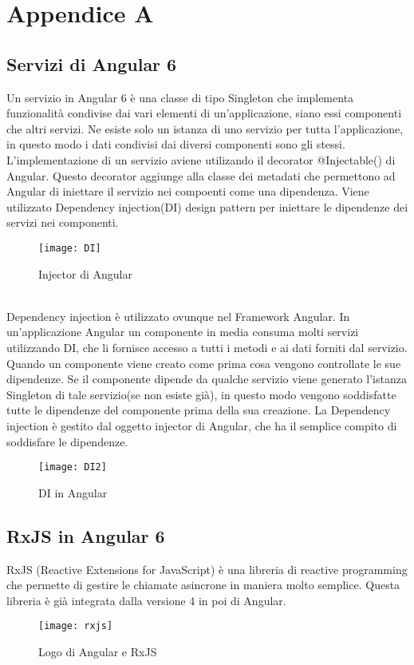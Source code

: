 
\chapter{Appendice A}
\section{Servizi di Angular 6}
 Un servizio in Angular 6 è una classe di tipo Singleton che implementa funzionalità condivise dai vari elementi di un’applicazione, siano essi componenti che altri servizi.
Ne esiste solo un istanza di uno servizio per tutta l'applicazione, in questo modo i dati condivisi dai diversi componenti sono gli stessi.
\\

L'implementazione di un servizio aviene utilizando il decorator @Injectable() di Angular. Questo decorator aggiunge alla classe dei metadati che permettono ad Angular di iniettare il servizio nei compoenti come una dipendenza. Viene utilizzato Dependency injection(DI) design pattern per iniettare le dipendenze dei servizi nei componenti. 
\begin{figure}[!h] 
	\centering 
	\texttt{[image: DI]} 
	\caption{Injector di Angular}
\end{figure}
\\

Dependency injection è utilizzato ovunque nel Framework Angular. In un'applicazione Angular un componente in media consuma molti servizi utilizzando DI, che li fornisce accesso a tutti i metodi e ai dati forniti dal servizio. 
\\ 

Quando un componente viene creato come prima cosa vengono controllate le sue dipendenze. Se il componente dipende da qualche servizio viene generato l'istanza Singleton di tale servizio(se non esiste già), in questo modo vengono soddisfatte tutte le dipendenze del componente prima della sua creazione. 
La Dependency injection è gestito dal oggetto injector di Angular, che ha il semplice compito di soddisfare le dipendenze. 
\begin{figure}[!ht] 
	\centering 
	\texttt{[image: DI2]} 
	\caption{DI in Angular}
\end{figure}
\section{RxJS in Angular 6}
RxJS (Reactive Extensions for JavaScript) è una libreria di reactive programming che permette di gestire le chiamate asincrone in maniera molto semplice. Questa libreria è già integrata dalla versione 4 in poi di Angular. 
\begin{figure}[!ht] 
	\centering 
	\texttt{[image: rxjs]} 
	\caption{Logo di Angular e RxJS}
\end{figure}

